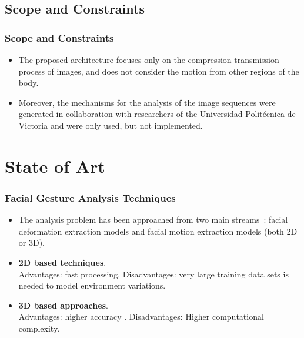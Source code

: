 \documentclass[compress]{beamer}
\begin{document}
\subsection{Scope and Constraints}
\begin{frame}
	\frametitle{Scope and Constraints}
	\begin{itemize}
	\item The proposed architecture focuses only on the compression-transmission process of images, and does not consider the motion from other regions of the body.
	\item Moreover, the mechanisms for the analysis of the image sequences were generated in collaboration with researchers of the Universidad Polit\'ecnica de Victoria and were only used, but not implemented.
	\end{itemize}
\end{frame}

\section{State of Art}
\begin{frame}
	\frametitle{Facial Gesture Analysis Techniques}
	\begin{itemize}
	\item The analysis problem has been approached from two main streams~\cite{Fasel2003}: facial deformation extraction models and facial motion extraction models (both 2D or 3D).
	\item \textbf{2D based techniques}.\\Advantages: fast processing. Disadvantages: very large training data sets is needed to model environment variations.
	\item \textbf{3D based approaches}.\\Advantages: higher accuracy \cite{Fang2012}. Disadvantages: Higher computational complexity.
	\end{itemize}
\end{frame}
\end{document}
